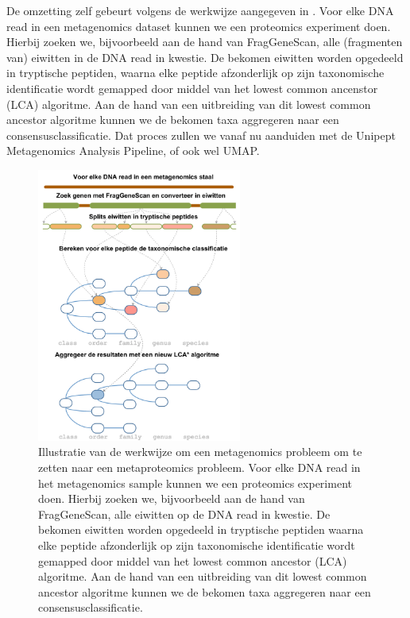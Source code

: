 De omzetting zelf gebeurt volgens de werkwijze aangegeven in
. Voor elke DNA read in een metagenomics dataset kunnen we
een proteomics experiment doen. Hierbij zoeken we, bijvoorbeeld aan de hand van
FragGeneScan, alle (fragmenten van) eiwitten in de DNA read in kwestie. De
bekomen eiwitten worden opgedeeld in tryptische peptiden, waarna elke peptide
afzonderlijk op zijn taxonomische identificatie wordt gemapped door middel van
het lowest common ancenstor (LCA) algoritme. Aan de hand van een uitbreiding van
dit lowest common ancestor algoritme kunnen we de bekomen taxa aggregeren naar
een consensusclassificatie. Dat proces zullen we vanaf nu aanduiden met de
Unipept Metagenomics Analysis Pipeline, of ook wel UMAP.

\begin{figure}[hbt]
	\centering 
	\includegraphics[width=0.6\textwidth]{includes/van_metagenoom_naar_metaproteoom}
	\caption{Illustratie van de werkwijze om een metagenomics probleem om te 
	zetten naar een metaproteomics probleem. Voor elke DNA read in het 
	metagenomics sample kunnen we een proteomics experiment doen. Hierbij 
	zoeken we, bijvoorbeeld aan de hand van FragGeneScan, alle eiwitten op 
	de DNA read in kwestie. De bekomen eiwitten worden opgedeeld in 
	tryptische peptiden waarna elke peptide afzonderlijk op zijn taxonomische 
	identificatie wordt gemapped door middel van het lowest common ancestor 
	(LCA) algoritme. Aan de hand van een uitbreiding van dit lowest common 
	ancestor algoritme kunnen we de bekomen taxa aggregeren naar een 
	consensusclassificatie.}
	\label{fig:van_naar}
\end{figure}

